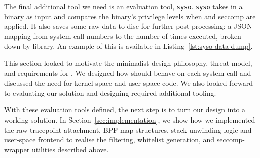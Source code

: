 The final additional tool we need is an evaluation tool, \texttt{syso}.
\texttt{syso} takes in a binary as input and compares the 
binary's privilege levels when \af and seccomp are applied. It also saves
some raw data to disc for further post-processing: a JSON mapping from
system call numbers to the number of times executed, broken down by library. An
example of this is available in Listing~\ref{lst:syso-data-dump}.

This section looked to motivate the minimalist design philosophy, threat model,
and requirements for \af. We designed how \af should behave on each system call
and discussed the need for kernel-space and user-space code. We also looked
forward to evaluating our solution and designing required additional tooling.

With these evaluation tools defined, the next step is to turn our design into a
working solution. In Section \ref{sec:implementation}, we show how we implemented the raw 
tracepoint attachment, BPF map structures, stack-unwinding logic and user-space 
frontend to realise the filtering, whitelist generation, and 
seccomp-wrapper utilities described above.

